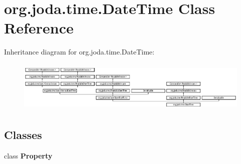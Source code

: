 \hypertarget{classorg_1_1joda_1_1time_1_1_date_time}{\section{org.\-joda.\-time.\-Date\-Time Class Reference}
\label{classorg_1_1joda_1_1time_1_1_date_time}
}
Inheritance diagram for org.\-joda.\-time.\-Date\-Time\-:\begin{figure}[H]
\begin{center}
\leavevmode
\includegraphics[height=2.466960cm]{classorg_1_1joda_1_1time_1_1_date_time}
\end{center}
\end{figure}
\subsection*{Classes}
\begin{DoxyCompactItemize}
\item 
class {\bfseries Property}
\end{DoxyCompactItemize}
